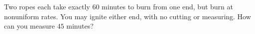 Two ropes each take exactly $60$ minutes to burn from one end, but burn at nonuniform rates. You may ignite either end, with no cutting or measuring. How can you measure $45$ minutes?

